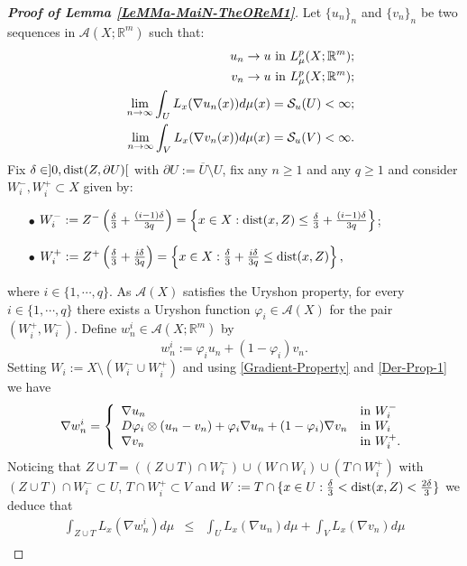 \documentclass[10pt]{amsart}
\numberwithin{equation}{section}
\theoremstyle{definition}
\theoremstyle{remark}
\begin{document}
\begin{proof}[\bf Proof of Lemma \ref{LeMMa-MaiN-TheOReM1}]
Let $\{u_n\}_n$ and $\{v_n\}_n$ be two sequences in $\mathcal{A}(X;{{\mathbb R}}^m)$ such that:
\begin{eqnarray}
&& u_n\to u\hbox{ in }L^p_\mu(X;{{\mathbb R}}^m);\label{PrOoF-MT2-EquA1}\\
&& v_n\to u\hbox{ in }L^p_\mu(X;{{\mathbb R}}^m);\label{PrOoF-MT2-EquA2}\\
&& \lim_{n\to\infty}\int_UL_x(\nabla u_n(x))d\mu(x)=\mathcal{S}_u(U)<\infty;\label{PrOoF-MT2-EquA3}\\
&& \lim_{n\to\infty}\int_VL_x(\nabla v_n(x))d\mu(x)=\mathcal{S}_u(V)<\infty.\label{PrOoF-MT2-EquA4}
\end{eqnarray}
Fix $\delta\in]0,{\rm dist}(Z,\partial U)[$ with $\partial U:=\overline{U}\setminus U$, fix any $n\geq 1$ and any $q\geq 1$ and consider $W^-_i,W^+_i\subset X$ given by:
\begin{itemize} 
\item[$\bullet$]$W^-_i:=Z^-\left({\delta\over 3}+{(i-1)\delta\over 3q}\right)=\left\{x\in X:{\rm dist}(x,Z)\leq {\delta\over 3}+{(i-1)\delta\over 3q}\right\}$;
\item[$\bullet$]$W^+_i:=Z^+\left({\delta\over 3}+{i\delta\over 3q}\right)=\left\{x\in X:{\delta\over 3}+{i\delta\over 3q}\leq{\rm dist}(x,Z)\right\},$
\end{itemize}
where $i\in\{1,\cdots,q\}$. As $\mathcal{A}(X)$ satisfies the Uryshon property, for every $i\in\{1,\cdots,q\}$ there exists a Uryshon function $\varphi_i\in\mathcal{A}(X)$ for the pair $(W^+_i,W^-_i)$. Define $w_n^i\in\mathcal{A}(X;{{\mathbb R}}^m)$ by 
$$
w^i_n:=\varphi_iu_n+(1-\varphi_i)v_n.
$$ 
Setting $W_i:=X\setminus (W^-_i\cup W^{+}_i)$ and using \eqref{Gradient-Property} and \eqref{Der-Prop-1} we have
$$
\nabla w_n^i=\left\{
\begin{array}{ll}
\nabla u_n&\hbox{in }W^-_i\\
D\varphi_i\otimes(u_n-v_n)+\varphi_i\nabla u_n+(1-\varphi_i)\nabla v_n&\hbox{in }W_i\\
\nabla v_n&\hbox{in }W^+_i.
\end{array}
\right.
$$
Noticing that $Z\cup T=((Z\cup T)\cap W^-_i)\cup(W\cap W_i)\cup(T\cap W^+_i)$ with $(Z\cup T)\cap W_i^-\subset U$, $T\cap W^+_i\subset V$ and $W:=T\cap\{x\in U:{\delta\over 3}<{\rm dist}(x,Z)<{2\delta\over 3}\}$ we deduce that 
\begin{eqnarray}
\int_{Z\cup T}L_x(\nabla w^i_n)d\mu&\leq&\int_UL_x(\nabla u_n)d\mu+\int_VL_x(\nabla v_n)d\mu\label{LayERs-Eq1}\\

\end{eqnarray}
\end{proof}
\end{document}
